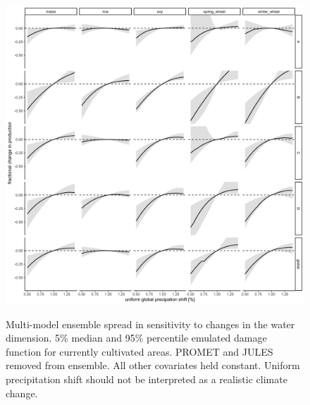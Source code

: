 \documentclass[10pt]{article}
\begin{document}
\begin{figure}[h!]
\includegraphics[width=\textwidth]{s_water.png}\\
\caption{Multi-model ensemble spread in sensitivity to changes in the water dimension. 5\% median and 95\% percentile emulated damage function for currently cultivated areas. PROMET and JULES removed from ensemble. All other covariates held constant. Uniform precipitation shift should not be interpreted as a realistic climate change.}
\label{fig:water}
\end{figure}
\end{document}
